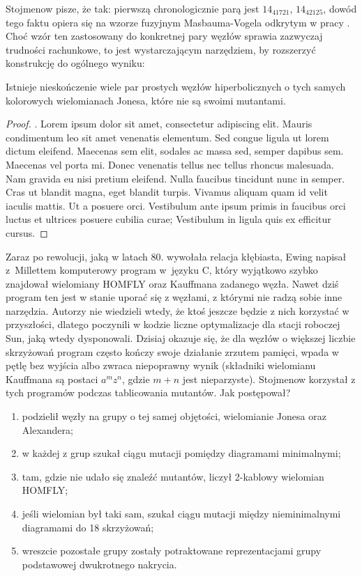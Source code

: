 Stojmenow pisze, że tak: pierwszą chronologicznie parą jest $14_{41721}$, $14_{42125}$, dowód tego faktu opiera się na wzorze fuzyjnym Masbauma-Vogela odkrytym w pracy \cite{masbaum94}.
Choć wzór ten zastosowany do konkretnej pary węzłów sprawia zazwyczaj trudności rachunkowe, to jest wystarczającym narzędziem, by rozszerzyć konstrukcję do ogólnego wyniku:

\begin{proposition}
    Istnieje nieskończenie wiele par prostych węzłów hiperbolicznych o tych samych kolorowych wielomianach Jonesa, które nie są swoimi mutantami.
\end{proposition}

\begin{proof}
    \cite{tanaka09}.
    Lorem ipsum dolor sit amet, consectetur adipiscing elit.
    Mauris condimentum leo sit amet venenatis elementum.
    Sed congue ligula ut lorem dictum eleifend.
    Maecenas sem elit, sodales ac massa sed, semper dapibus sem.
    Maecenas vel porta mi.
    Donec venenatis tellus nec tellus rhoncus malesuada.
    Nam gravida eu nisi pretium eleifend.
    Nulla faucibus tincidunt nunc in semper.
    Cras ut blandit magna, eget blandit turpis.
    Vivamus aliquam quam id velit iaculis mattis.
    Ut a posuere orci.
    Vestibulum ante ipsum primis in faucibus orci luctus et ultrices posuere cubilia curae; Vestibulum in ligula quis ex efficitur cursus.
\end{proof}

Zaraz po rewolucji, jaką w latach 80. wywołała relacja kłębiasta, Ewing napisał z~Millettem komputerowy program w~języku C, który wyjątkowo szybko znajdował wielomiany HOMFLY oraz Kauffmana zadanego węzła.
Nawet dziś program ten jest w stanie uporać się z węzłami, z którymi nie radzą sobie inne narzędzia.
Autorzy nie wiedzieli wtedy, że ktoś jeszcze będzie z nich korzystać w przyszłości, dlatego poczynili w kodzie liczne optymalizacje dla stacji roboczej Sun, jaką wtedy dysponowali.
Dzisiaj okazuje się, że dla węzłów o większej liczbie skrzyżowań program często kończy swoje działanie zrzutem pamięci, wpada w pętlę bez wyjścia albo zwraca niepoprawny wynik (składniki wielomianu Kauffmana są postaci $a^m z^n$, gdzie $m + n$ jest nieparzyste).
Stojmenow korzystał z tych programów podczas tablicowania mutantów.
Jak postępował?
\begin{enumerate}
    \item podzielił węzły na grupy o tej samej objętości, wielomianie Jonesa oraz Alexandera;
    \item w każdej z grup szukał ciągu mutacji pomiędzy diagramami minimalnymi;
    \item tam, gdzie nie udało się znaleźć mutantów, liczył 2-kablowy wielomian HOMFLY;
    \item jeśli wielomian był taki sam, szukał ciągu mutacji między nieminimalnymi diagramami do 18 skrzyżowań;
    \item wreszcie pozostałe grupy zostały potraktowane reprezentacjami grupy podstawowej dwukrotnego nakrycia.
\end{enumerate}

